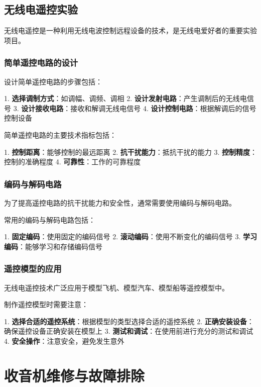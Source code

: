 \documentclass[12pt,UTF8]{ctexbook}
\begin{document}
\chapter{无线电遥控实验}

无线电遥控是一种利用无线电波控制远程设备的技术，是无线电爱好者的重要实验项目。

\section{简单遥控电路的设计}

设计简单遥控电路的步骤包括：

1. \textbf{选择调制方式}：如调幅、调频、调相
2. \textbf{设计发射电路}：产生调制后的无线电信号
3. \textbf{设计接收电路}：接收和解调无线电信号
4. \textbf{设计控制电路}：根据解调后的信号控制设备

简单遥控电路的主要技术指标包括：

1. \textbf{控制距离}：能够控制的最远距离
2. \textbf{抗干扰能力}：抵抗干扰的能力
3. \textbf{控制精度}：控制的准确程度
4. \textbf{可靠性}：工作的可靠程度

\section{编码与解码电路}

为了提高遥控电路的抗干扰能力和安全性，通常需要使用编码与解码电路。

常用的编码与解码电路包括：

1. \textbf{固定编码}：使用固定的编码信号
2. \textbf{滚动编码}：使用不断变化的编码信号
3. \textbf{学习编码}：能够学习和存储编码信号

\section{遥控模型的应用}

无线电遥控技术广泛应用于模型飞机、模型汽车、模型船等遥控模型中。

制作遥控模型时需要注意：

1. \textbf{选择合适的遥控系统}：根据模型的类型选择合适的遥控系统
2. \textbf{正确安装设备}：确保遥控设备正确安装在模型上
3. \textbf{测试和调试}：在使用前进行充分的测试和调试
4. \textbf{安全操作}：注意安全，避免发生意外

\part{收音机维修与故障排除}
\end{document}
